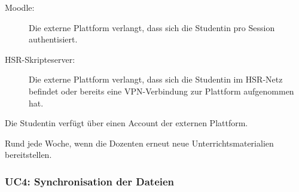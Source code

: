 \documentclass[a4paper]{article}
\begin{document}
\begin{description}[uclist]
\begin{description}
      \item[Moodle:] Die externe Plattform verlangt, dass sich die Studentin pro Session authentisiert.
      \item[HSR-Skripteserver:] Die externe Plattform verlangt, dass sich die Studentin im HSR-Netz befindet oder bereits eine VPN-Verbindung zur Plattform aufgenommen hat.
    \end{description}
  \item[Special Requirements] Die Studentin verfügt über einen Account der externen Plattform.
  \item[Frequency of Occurrence] Rund jede Woche, wenn die Dozenten erneut neue Unterrichtsmaterialien bereitstellen.
\end{description}


\subsubsection{UC4: Synchronisation der Dateien}
\end{document}
